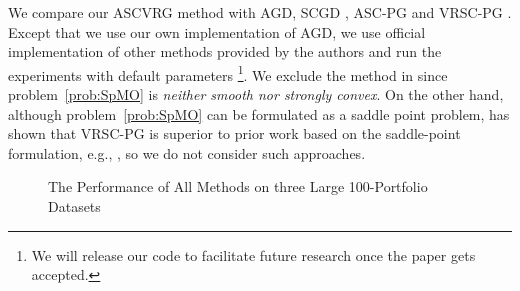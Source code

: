 \documentclass[11pt]{article}
\begin{document}
We compare our ASCVRG method with AGD, SCGD \cite{Wang-2017-Stochastic}, ASC-PG \cite{Wang-2017-Accelerating} and VRSC-PG \cite{Huo-2017-Accelerated}. Except that we use our own implementation of AGD, we use official implementation of other methods provided by the authors and run the experiments with default parameters \footnote{We will release our code to facilitate future research once the paper gets accepted.}. We exclude the method in \cite{Lian-2017-Finite} since problem~\eqref{prob:SpMO} is \textit{neither smooth nor strongly convex}. On the other hand, although problem~\eqref{prob:SpMO} can be formulated as a saddle point problem, \cite{Huo-2017-Accelerated} has shown that VRSC-PG is superior to prior work based on the saddle-point formulation, e.g., \cite{Yu-2017-Fast}, so we do not consider such approaches. 
\begin{figure}[!htb] 
\hspace{-4em}
%
\caption{The Performance of All Methods on three Large 100-Portfolio Datasets}\label{Fig:Large-Data}
\end{figure}
\end{document}
